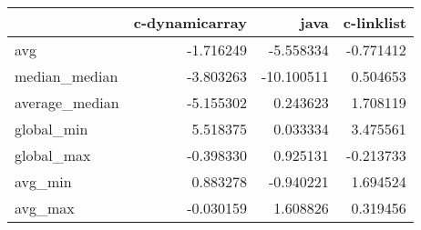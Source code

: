 \begin{tabular}{lrrr}
\toprule
{} &  c-dynamicarray &       java &  c-linklist \\
\midrule
avg            &       -1.716249 &  -5.558334 &   -0.771412 \\
median\_median  &       -3.803263 & -10.100511 &    0.504653 \\
average\_median &       -5.155302 &   0.243623 &    1.708119 \\
global\_min     &        5.518375 &   0.033334 &    3.475561 \\
global\_max     &       -0.398330 &   0.925131 &   -0.213733 \\
avg\_min        &        0.883278 &  -0.940221 &    1.694524 \\
avg\_max        &       -0.030159 &   1.608826 &    0.319456 \\
\bottomrule
\end{tabular}
